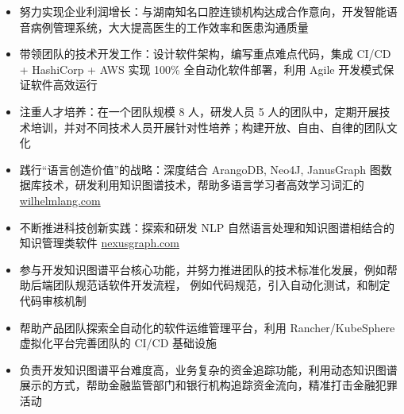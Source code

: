 \documentclass[10pt,a4paper,ragged2e,withhyper]{altacv}
\begin{document}

\makecvheader

\begin{paracol}{2}

    \begin{itemize}
        \item 努力实现企业利润增长：与湖南知名口腔连锁机构达成合作意向，开发智能语音病例管理系统，大大提高医生的工作效率和医患沟通质量
        \item 带领团队的技术开发工作：设计软件架构，编写重点难点代码，集成 CI/CD + HashiCorp + AWS 实现 100\% 全自动化软件部署，利用 Agile 开发模式保证软件高效运行
        \item 注重人才培养：在一个团队规模 8 人，研发人员 5 人的团队中，定期开展技术培训，并对不同技术人员开展针对性培养；构建开放、自由、自律的团队文化
        \item 践行“语言创造价值”的战略：深度结合 ArangoDB, Neo4J, JanusGraph 图数据库技术，研发利用知识图谱技术，帮助多语言学习者高效学习词汇的 \href{https://wilhelmlang.com/}{wilhelmlang.com}
        \item 不断推进科技创新实践：探索和研发 NLP 自然语言处理和知识图谱相结合的知识管理类软件 \href{https://nexusgraph.com/}{nexusgraph.com}
    \end{itemize}

    \divider

    \begin{itemize}
        \item 参与开发知识图谱平台核心功能，并努力推进团队的技术标准化发展，例如帮助后端团队规范话软件开发流程，
              例如代码规范，引入自动化测试，和制定代码审核机制
        \item 帮助产品团队探索全自动化的软件运维管理平台，利用 Rancher/KubeSphere 虚拟化平台完善团队的 CI/CD 基础设施
        \item 负责开发知识图谱平台难度高，业务复杂的资金追踪功能，利用动态知识图谱展示的方式，帮助金融监管部门和银行机构追踪资金流向，精准打击金融犯罪活动
    \end{itemize}


\end{paracol}
\end{document}
